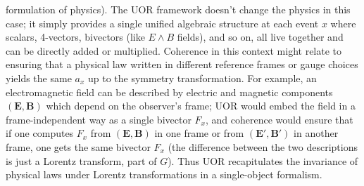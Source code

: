 \documentclass[12pt]{article}
\begin{document}
\begin{itemize}
formulation of physics). The UOR framework doesn’t change the physics in this case; it simply provides a single unified algebraic structure at each event $x$ where scalars, 4-vectors, bivectors (like $E\wedge B$ fields), and so on, all live together and can be directly added or multiplied. Coherence in this context might relate to ensuring that a physical law written in different reference frames or gauge choices yields the same $a_x$ up to the symmetry transformation. For example, an electromagnetic field can be described by electric and magnetic components $(\mathbf{E}, \mathbf{B})$ which depend on the observer’s frame; UOR would embed the field in a frame-independent way as a single bivector $F_x$, and coherence would ensure that if one computes $F_x$ from $(\mathbf{E},\mathbf{B})$ in one frame or from $(\mathbf{E}',\mathbf{B}')$ in another frame, one gets the same bivector $F_x$ (the difference between the two descriptions is just a Lorentz transform, part of $G$). Thus UOR recapitulates the invariance of physical laws under Lorentz transformations in a single-object formalism.

\end{itemize}
\end{document}
